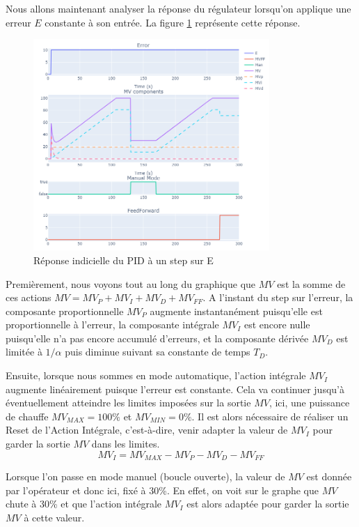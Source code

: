Nous allons maintenant analyser la réponse du régulateur lorsqu'on applique une erreur $E$ constante à son entrée.
La figure \ref{fig:Step_Response_PID} représente cette réponse.
\begin{figure}[h]
    \centering
    \includegraphics[width=0.8\textwidth]{../Plots/PID/PID_Response_error_step.png}
    \caption{Réponse indicielle du PID à un step sur E}
    \label{fig:Step_Response_PID}
\end{figure}
Premièrement, nous voyons tout au long du graphique que $MV$ est la somme de ces actions $MV = MV_P + MV_I + MV_D + MV_{FF}$.
A l'instant du step sur l'erreur, la composante proportionnelle $MV_P$ augmente instantanément puisqu'elle est proportionnelle à l'erreur, la composante intégrale $MV_I$ est encore nulle puisqu'elle n'a pas encore accumulé d'erreurs, et la composante dérivée $MV_D$ est limitée à $1/\alpha$ puis diminue suivant sa constante de temps $T_D$.

Ensuite, lorsque nous sommes en mode automatique, l'action intégrale $MV_I$ augmente linéairement puisque l'erreur est constante.
Cela va continuer jusqu'à éventuellement atteindre les limites imposées sur la sortie $MV$, ici, une puissance de chauffe $MV_{MAX} = 100\%$ et $MV_{MIN} = 0\%$.
Il est alors nécessaire de réaliser un Reset de l'Action Intégrale, c'est-à-dire, venir adapter la valeur de $MV_I$ pour garder la sortie $MV$ dans les limites.
\begin{equation*}
    MV_I = MV_{MAX} - MV_P - MV_D - MV_{FF}
\end{equation*}

Lorsque l'on passe en mode manuel (boucle ouverte), la valeur de $MV$ est donnée par l'opérateur et donc ici, fixé à 30\%.
En effet, on voit sur le graphe que $MV$ chute à 30\% et que l'action intégrale $MV_I$ est alors adaptée pour garder la sortie $MV$ à cette valeur.

